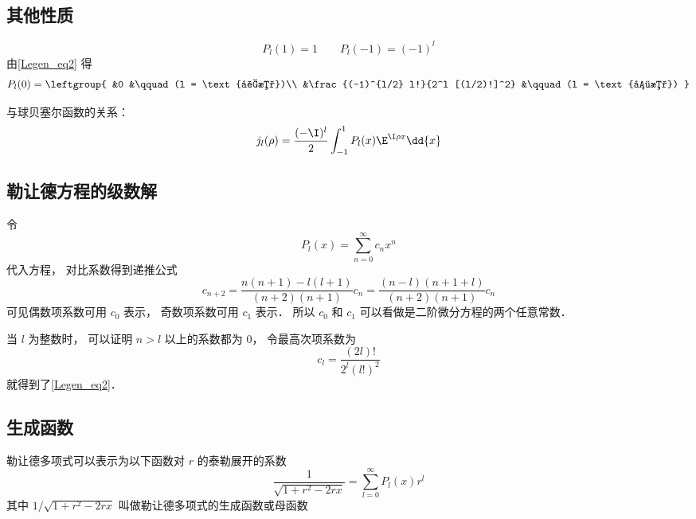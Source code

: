 \subsection{其他性质}
\begin{equation}
P_l(1) = 1 \qquad P_l(-1) = (-1)^l
\end{equation}
由\autoref{Legen_eq2} 得
\begin{equation}\label{Legen_eq5}
P_l(0) = \leftgroup{
&0 &\qquad (l = \text{奇数})\\
&\frac{(-1)^{l/2} l!}{2^l [(l/2)!]^2} &\qquad (l = \text{偶数})
}\end{equation}

与球贝塞尔函数的关系：
\begin{equation}\label{Legen_eq3}
j_l(\rho) = \frac{(-\I)^l}{2} \int_{-1}^1 P_l(x) \E^{\I \rho x} \dd{x}
\end{equation}

\subsection{勒让德方程的级数解}
令
\begin{equation}
P_l(x) = \sum_{n = 0}^\infty c_n x^n
\end{equation}
代入方程， 对比系数得到递推公式
\begin{equation}
c_{n+2} = \frac{n(n+1)-l(l+1)}{(n+2)(n+1)}c_n = \frac{(n-l)(n+1+l)}{(n+2)(n+1)}c_n
\end{equation}
可见偶数项系数可用 $c_0$ 表示， 奇数项系数可用 $c_1$ 表示． 所以 $c_0$ 和 $c_1$ 可以看做是二阶微分方程的两个任意常数．

当 $l$ 为整数时， 可以证明 $n > l$ 以上的系数都为 0， 令最高次项系数为
\begin{equation}
c_l = \frac{(2l)!}{2^l (l!)^2}
\end{equation}
就得到了\autoref{Legen_eq2}．

\subsection{生成函数}
勒让德多项式可以表示为以下函数对 $r$ 的泰勒展开的系数
\begin{equation}
\frac{1}{\sqrt{1 + r^2 - 2rx}} = \sum_{l = 0}^\infty P_l(x) r^l
\end{equation}
其中 $1/\sqrt {1+ r^2 - 2rx}$ 叫做勒让德多项式的生成函数或母函数
